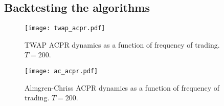     \subsection{Backtesting the algorithms}
        \begin{figure}[htbp]
            \texttt{[image: twap\_acpr.pdf]}
            \caption{TWAP ACPR dynamics as a function of frequency of trading. $T = 200$.}
        \end{figure}

        \begin{figure}[htbp]
            \texttt{[image: ac\_acpr.pdf]}
            \caption{Almgren-Chriss ACPR dynamics as a function of frequency of trading. $T = 200$.}
        \end{figure}